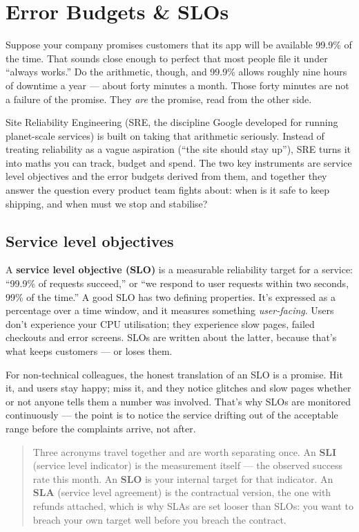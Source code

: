 \section{Error Budgets \& SLOs}
Suppose your company promises customers that its app will be available 99.9\% of the time. That sounds close enough to perfect that most people file it under ``always works.'' Do the arithmetic, though, and 99.9\% allows roughly nine hours of downtime a year — about forty minutes a month. Those forty minutes are not a failure of the promise. They \emph{are} the promise, read from the other side.


Site Reliability Engineering (SRE, the discipline Google developed for running planet-scale services) is built on taking that arithmetic seriously. Instead of treating reliability as a vague aspiration (``the site should stay up''), SRE turns it into maths you can track, budget and spend. The two key instruments are service level objectives and the error budgets derived from them, and together they answer the question every product team fights about: when is it safe to keep shipping, and when must we stop and stabilise?



\subsection{Service level objectives}


A \textbf{service level objective (SLO)} is a measurable reliability target for a service: ``99.9\% of requests succeed,'' or ``we respond to user requests within two seconds, 99\% of the time.'' A good SLO has two defining properties. It's expressed as a percentage over a time window, and it measures something \emph{user-facing}. Users don't experience your CPU utilisation; they experience slow pages, failed checkouts and error screens. SLOs are written about the latter, because that's what keeps customers — or loses them.


For non-technical colleagues, the honest translation of an SLO is a promise. Hit it, and users stay happy; miss it, and they notice glitches and slow pages whether or not anyone tells them a number was involved. That's why SLOs are monitored continuously — the point is to notice the service drifting out of the acceptable range before the complaints arrive, not after.



\begin{quote}\small
Three acronyms travel together and are worth separating once. An \textbf{SLI} (service level indicator) is the measurement itself — the observed success rate this month. An \textbf{SLO} is your internal target for that indicator. An \textbf{SLA} (service level agreement) is the contractual version, the one with refunds attached, which is why SLAs are set looser than SLOs: you want to breach your own target well before you breach the contract.
\end{quote}


